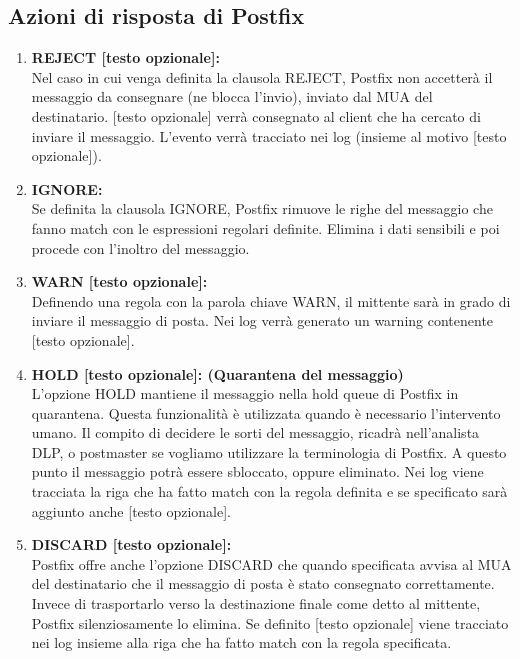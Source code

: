   \begin{table}[htp]
    \subsection{Azioni di risposta di Postfix}
  \begin{enumerate}[label=\textbf{\arabic*})]
      \item{\textbf{REJECT [testo opzionale]:}}\\
      Nel caso in cui venga definita la clausola REJECT, Postfix non accetterà il messaggio 
      da consegnare (ne blocca l'invio), inviato dal MUA del destinatario.
      [testo opzionale] verrà consegnato al client che ha cercato di inviare il messaggio.
      L'evento verrà tracciato nei log (insieme al motivo [testo opzionale]).
  
      \item{\textbf{IGNORE:}}\\
      Se definita la clausola IGNORE, Postfix rimuove le righe del messaggio che fanno match con 
      le espressioni regolari definite. Elimina i dati sensibili e poi procede con l'inoltro del 
      messaggio.
      
      \item{\textbf{WARN [testo opzionale]:}}\\
      Definendo una regola con la parola chiave WARN, il mittente sarà in grado di inviare il messaggio di 
      posta. Nei log verrà generato un warning contenente [testo opzionale].
      
      \item{\textbf{HOLD [testo opzionale]: (Quarantena del messaggio)}}\\
      L'opzione HOLD mantiene il messaggio nella hold queue di Postfix in quarantena. Questa funzionalità
      è utilizzata quando è necessario l'intervento umano. Il compito di decidere le sorti del messaggio,
      ricadrà nell'analista DLP, o postmaster se vogliamo utilizzare la terminologia di Postfix. A questo punto
      il messaggio potrà essere sbloccato, oppure eliminato.
      Nei log viene tracciata la riga che ha fatto match con la regola definita e se specificato sarà aggiunto
      anche [testo opzionale].
      
      
      \item{\textbf{DISCARD [testo opzionale]:}}\\
      Postfix offre anche l'opzione DISCARD che quando specificata avvisa al MUA del destinatario che il 
      messaggio di posta è stato consegnato correttamente. Invece di trasportarlo verso la destinazione finale
      come detto al mittente, Postfix silenziosamente lo elimina.
      Se definito [testo opzionale] viene tracciato nei log insieme alla riga che ha fatto match con la regola 
      specificata. 
      

\end{enumerate}
\end{table}

